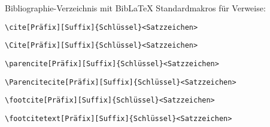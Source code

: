 


\begin{frame}[fragile]{Bibliographie-Verzeichnis mit Bib\LaTeX}
Standardmakros für Verweise:
\begin{lstlisting}[sytle=tex]
\cite[Präfix][Suffix]{Schlüssel}<Satzzeichen>
\end{lstlisting}
\begin{lstlisting}[style=tex]
\Cite[Präfix][Suffix]{Schlüssel}<Satzzeichen>
\end{lstlisting}
\begin{lstlisting}[style=tex]
\parencite[Präfix][Suffix]{Schlüssel}<Satzzeichen>
\end{lstlisting}
\begin{lstlisting}[style=tex]
\Parencitecite[Präfix][Suffix]{Schlüssel}<Satzzeichen>
\end{lstlisting}
\begin{lstlisting}[style=tex]
\footcite[Präfix][Suffix]{Schlüssel}<Satzzeichen>
\end{lstlisting}
\begin{lstlisting}[style=tex]
\footcitetext[Präfix][Suffix]{Schlüssel}<Satzzeichen>
\end{lstlisting}
\end{frame}


